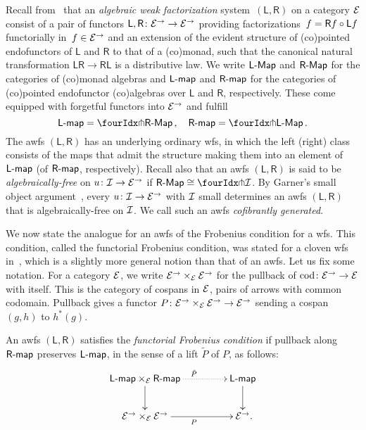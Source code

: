 \documentclass[reqno,10pt,a4paper,oneside,draft]{amsart}
\newcommand{\LL}{\mathsf{L}}
\newcommand{\RR}{\mathsf{R}}
\begin{document}
{{Recall from~\cite{garner:small-object-argument,grandis-tholen-nwfs} that an \emph{algebraic weak factorization} system~$(\LL, \RR)$ on a category $\cal{E}$ consist of a pair of functors $\LL, \RR \co \cal{E}^\to \to \cal{E}^\to$ providing factorizations~$f = \RR f \cc \LL f$ functorially in~$f \in \cal{E}^\to$ and an extension of the evident structure of (co)pointed endofunctors of $\LL$ and $\RR$ to that of a (co)monad, such that the canonical natural transformation $\LL \RR \to \RR \LL$ is a distributive law.
We write $\pCoalg{\LL}$ and $\pAlg{\RR}$ for the categories of (co)monad algebras and $\pcoalg{\LL}$ and $\palg{\RR}$ for the categories of (co)pointed endofunctor (co)algebras over $\LL$ and $\RR$, respectively. 
These come equipped with forgetful functors into $\cal{E}^\to$ and fulfill
\[
\pcoalg{\LL} = \liftl{\pAlg{\RR}}
\, , \quad
\palg{\RR} = \liftr{\pCoalg{\LL}}
\, .\]
The awfs $(\LL, \RR)$ has an underlying ordinary wfs, in which the left (right) class consists of the maps that admit the structure making them into an element of $\pcoalg{\LL}$ (of $\palg{\RR}$, respectively).
Recall also that an awfs
$(\LL, \RR)$ is said to be \emph{algebraically-free} on $u \co \cal{I} \to \cal{E}^\to$ if $\pAlg{\RR} \iso \liftr{\cal{I}}$.
By Garner's small object argument~\cite{garner:small-object-argument}, every $u \co \cal{I} \to \cal{E}^\to$ with $\cal{I}$ small determines an awfs $(\LL, \RR)$ that is algebraically-free on $\cal{I}$.
We call such an awfs \emph{cofibrantly generated}.

We now state the analogue for an awfs of the Frobenius condition for a wfs.
This condition, called the functorial Frobenius condition, was stated for a cloven wfs in~\cite{garner:topological-simplicial}, which is a slightly more general notion than
that of an awfs.
Let us fix some notation.
For a category $\cal{E}$, we write $\cal{E}^\to \times_\cal{E} \cal{E}^\to$ for the pullback of $\cod \co \cal{E}^\to \to \cal{E}$ with itself.
This is the category of cospans in $\cal{E}$, \ie pairs of arrows with common codomain.
Pullback gives a functor $P \co  \cal{E}^\to \times_{\cal{E}} \cal{E}^\to \to \cal{E}^\to$ sending a cospan $(g, h)$ to $h^*(g)$.

\begin{definition} \label{functorial-frobenius}
An awfs $(\LL, \RR)$ satisfies the \emph{functorial Frobenius condition} if pullback along $\palg{\RR}$ preserves $\pcoalg{\LL}$, in the sense of a lift $\tilde{P}$ of $P$, as follows:
\[
\xymatrix@C+2em{
  \pcoalg{\LL} \times_{\cal{E}} \palg{\RR}
  \ar@{.>}[r]^{\tilde{P}}
  \ar[d]
&
  \pcoalg{\LL}
  \ar[d]
\\
  \cal{E}^\to \times_{\cal{E}} \cal{E}^\to
  \ar[r]_{P}
&
  \cal{E}^\to
\rlap{.}}
\]
\end{definition}

}}
\end{document}
